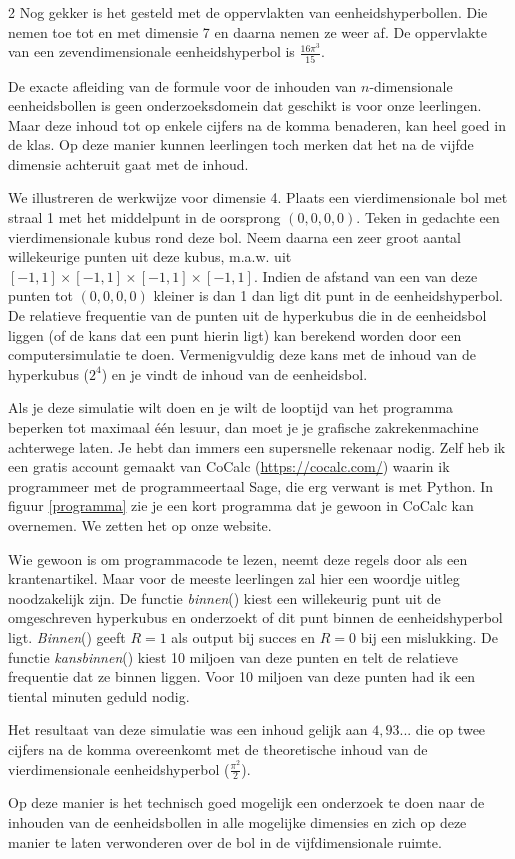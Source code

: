 \begin{multicols}{2}
Nog gekker is het gesteld met de oppervlakten van eenheidshyperbollen. Die nemen toe tot en met dimensie 7 en daarna nemen ze weer af. De oppervlakte van een zevendimensionale eenheidshyperbol is $\frac{16 \pi^3}{15}$. 

De exacte afleiding van de formule voor de inhouden van $n$-dimensionale eenheidsbollen is geen onderzoeksdomein dat geschikt is voor onze leerlingen. Maar deze inhoud tot op enkele cijfers na de komma benaderen, kan heel goed in de klas. Op deze manier kunnen leerlingen toch merken dat het na de vijfde dimensie achteruit gaat met de inhoud.

We illustreren de werkwijze voor dimensie 4. Plaats een vierdimensionale bol met straal 1 met het middelpunt in de oorsprong $(0, 0, 0, 0)$. Teken in gedachte een vierdimensionale kubus rond deze bol. Neem daarna een zeer groot aantal willekeurige punten uit deze kubus, m.a.w. uit $[-1,1]\times[-1,1]\times[-1,1]\times[-1,1]$. Indien de afstand van een van deze punten tot $(0, 0, 0, 0)$ kleiner is dan 1 dan ligt dit punt in de eenheidshyperbol. De relatieve frequentie van de punten uit de hyperkubus die in de eenheidsbol liggen (of de kans dat een punt hierin ligt) kan berekend worden door een computersimulatie te doen. Vermenigvuldig deze kans met de inhoud van de hyperkubus ($2^4$) en je vindt de inhoud van de eenheidsbol. 

Als je deze simulatie wilt doen en je wilt de looptijd van het programma beperken tot maximaal één lesuur, dan moet je je grafische zakrekenmachine achterwege laten. Je hebt dan immers een supersnelle rekenaar nodig. Zelf heb ik een gratis account gemaakt van CoCalc (\url{https://cocalc.com/}) waarin ik programmeer met de programmeertaal Sage, die erg verwant is met Python. In figuur \ref{programma} zie je een kort programma dat je gewoon in CoCalc kan overnemen. We zetten het op onze website.


Wie gewoon is om programmacode te lezen, neemt deze regels door als een krantenartikel. Maar voor de meeste leerlingen zal hier een woordje uitleg noodzakelijk zijn. De functie \emph{binnen}() kiest een willekeurig punt uit de omgeschreven hyperkubus en onderzoekt of dit punt binnen de eenheidshyperbol ligt. \emph{Binnen}() geeft $R=1$ als output bij succes en $R=0$ bij een mislukking. De functie \emph{kansbinnen}() kiest 10 miljoen van deze punten en telt de relatieve frequentie dat ze binnen liggen. Voor 10 miljoen van deze punten had ik een tiental minuten geduld nodig. 

Het resultaat van deze simulatie was een inhoud gelijk aan $4,93...$ die op twee cijfers na de komma overeenkomt met de theoretische inhoud van de vierdimensionale eenheidshyperbol ($\frac{\pi^2}{2}$). 

Op deze manier is het technisch goed mogelijk een onderzoek te doen naar de inhouden van de eenheidsbollen in alle mogelijke dimensies en zich op deze manier te laten verwonderen over de bol in de vijfdimensionale ruimte.

\end{multicols}
